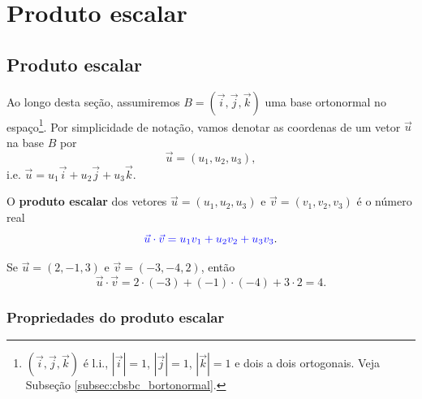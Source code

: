 
\chapter{Produto escalar}\label{cap_prodesc}
\badgeRevisar

\section{Produto escalar}\label{cap_prodesc_sec_prodesc}
\badgeRevisar

Ao longo desta seção, assumiremos $B = (\vec{i},\vec{j},\vec{k})$ uma base ortonormal no espaço\footnote{$(\vec{i},\vec{j},\vec{k})$ é l.i., $|\vec{i}|=1$, $|\vec{j}|=1$, $|\vec{k}|=1$ e dois a dois ortogonais. Veja Subseção \ref{subsec:cbsbc_bortonormal}.}. Por simplicidade de notação, vamos denotar as coordenas de um vetor $\vec{u}$ na base $B$ por
\begin{equation}
  \vec{u} = (u_1, u_2, u_3),
\end{equation}
i.e. $\vec{u} = u_1\vec{i} + u_2\vec{j} + u_3\vec{k}$.

O {\color{blue}\bf produto escalar} dos vetores $\vec{u} = (u_1,u_2,u_3)$ e $\vec{v}=(v_1,v_2,v_3)$ é o número real
\begin{equation}\label{eq:prodesc_ortonormal}
  {\color{blue}\vec{u}\cdot\vec{v} = u_1v_1+u_2v_2+u_3v_3}.
\end{equation}

\begin{ex}
  Se $\vec{u}=(2,-1,3)$ e $\vec{v}=(-3,-4,2)$, então
  \begin{equation}
    \vec{u}\cdot\vec{v} = 2\cdot(-3)+(-1)\cdot(-4)+3\cdot 2 = 4.
  \end{equation}
\end{ex}

\subsection{Propriedades do produto escalar}

